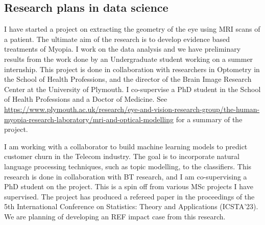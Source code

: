 \subsection{Research plans in data science}

I have started a project on extracting the geometry of the eye using
MRI scans of a patient. The ultimate aim of the research is to develop
evidence based treatments of Myopia. I work on the data analysis and
we have preliminary results from the work done by an Undergraduate
student working on a summer internship.  This project is done in
collaboration with researchers in Optometry in the School of Health
Professions, and the director of the Brain Image Research Center at
the University of Plymouth. I co-supervise a PhD student in the
School of Health Professions and a Doctor of Medicine. See
\url{https://www.plymouth.ac.uk/research/eye-and-vision-research-group/the-human-myopia-research-laboratory/mri-and-optical-modelling}
for a
summary of the project.


I am working with a collaborator to build machine learning models to
predict customer churn in the Telecom industry.  The goal is to
incorporate natural language processing techniques, such as topic
modelling, to the classifiers.  This research is done in collaboration
with BT research, and I am co-supervising a PhD student on the
project.  This is a spin off from various MSc projects I have
supervised.  The project has produced a refereed paper in the
proceedings of the 5th International Conference on Statistics: Theory
and Applications (ICSTA’23). We are planning of developing an
REF impact case from this research.
